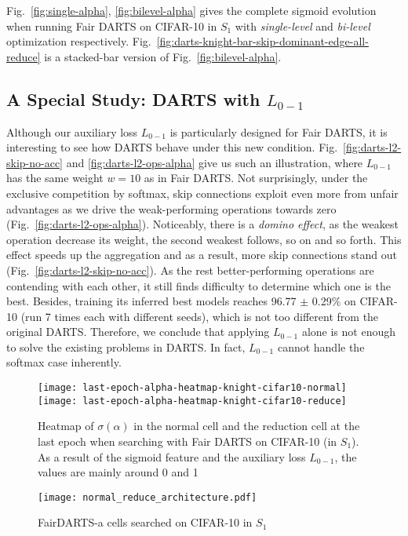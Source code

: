 \documentclass[runningheads]{llncs}
\begin{document}
Fig.~\ref{fig:single-alpha}, \ref{fig:bilevel-alpha} gives the complete sigmoid evolution when running Fair DARTS on CIFAR-10 in $S_1$ with \emph{single-level} and \emph{bi-level} optimization respectively. Fig.~\ref{fig:darts-knight-bar-skip-dominant-edge-all-reduce} is a stacked-bar version of Fig.~\ref{fig:bilevel-alpha}.

\subsection{A Special Study: DARTS with $L_{0-1}$ }

Although our auxiliary loss $L_{0-1}$ is particularly designed for Fair DARTS, it is interesting to see how DARTS behave under this new condition. Fig.~\ref{fig:darts-l2-skip-no-acc} and \ref{fig:darts-l2-ops-alpha} give us such an illustration, where $L_{0-1}$ has the same weight $w=10$ as in Fair DARTS. Not surprisingly, under the exclusive competition by softmax, skip connections exploit even more from unfair advantages as we drive the weak-performing operations towards zero (Fig.~\ref{fig:darts-l2-ops-alpha}). Noticeably,  there is a \emph{domino effect}, as the weakest operation decrease its weight, the second weakest follows, so on and so forth. This effect speeds up the aggregation and as a result, more skip connections stand out (Fig.~\ref{fig:darts-l2-skip-no-acc}). As the rest better-performing operations are contending with each other, it still finds difficulty to determine which one is the best. 
Besides, training its inferred best models reaches 96.77 $\pm$ 0.29\% on CIFAR-10  (run 7 times each with different seeds), which is not too different from the original DARTS. Therefore, we conclude that  applying $L_{0-1}$ alone is not enough to solve the existing problems in DARTS. In fact, $L_{0-1}$ cannot handle the softmax case inherently. 


\begin{figure}[ht]
	\centering
	\texttt{[image: last-epoch-alpha-heatmap-knight-cifar10-normal]}
	\texttt{[image: last-epoch-alpha-heatmap-knight-cifar10-reduce]}
\caption{Heatmap of $\sigma(\alpha)$ in the normal cell and the reduction cell at the last epoch when searching with Fair DARTS on CIFAR-10 (in $S_1$). As a result of the sigmoid feature and the auxiliary loss $L_{0-1}$, the values are mainly around 0 and 1}
	\label{fig:sigmoid-fair-darts-cifar}
\end{figure}

\begin{figure}[ht]
	\centering
	\texttt{[image: normal\_reduce\_architecture.pdf]}
\caption{FairDARTS-a cells searched on CIFAR-10 in $S_1$}
	\label{fig:normal-reduce-architecture}
\end{figure}
\end{document}
